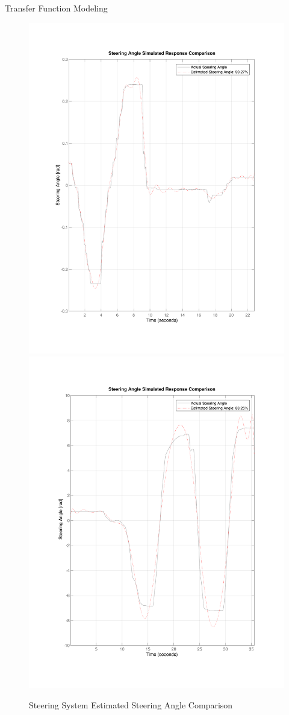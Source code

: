 \documentclass[final]{beamer}
\newlength{\onecolwid}
\begin{document}
\begin{frame}[t]
\begin{columns}[t]
\begin{column}{\onecolwid}
\begin{alertblock}{Transfer Function Modeling}
\begin{itemize}
\end{itemize} 
\vskip -1cm
\begin{figure}
	\centering
	{\includegraphics[width=0.48\linewidth]{figs/img/byWireSteeringTransferFunctionModel}}
		{\includegraphics[width=0.48\linewidth]{figs/img/manualSteeringTransferFunctionModel}}
	\caption{Steering System Estimated Steering Angle Comparison}
\end{figure}


\end{alertblock}
\end{column}
\end{columns}
\end{frame}
\end{document}
